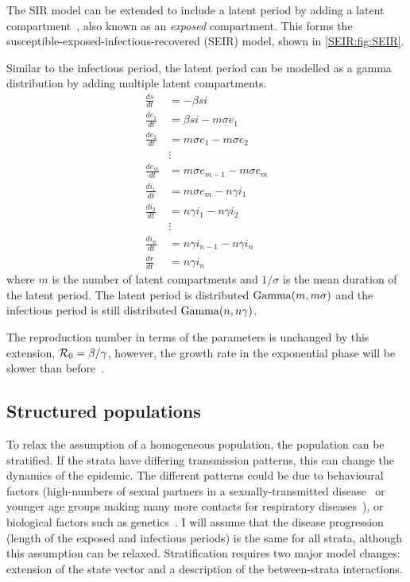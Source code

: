 \documentclass[thesis.tex]{subfiles}
\begin{document}
The SIR model can be extended to include a latent period by adding a latent compartment~\autocite[41]{keelingModeling}, also known as an \emph{exposed} compartment.
This forms the susceptible-exposed-infectious-recovered (SEIR) model, shown in \cref{SEIR:fig:SEIR}.

Similar to the infectious period, the latent period can be modelled as a gamma distribution by adding multiple latent compartments.
\begin{align}
\frac{ds}{dt} &= -\beta si \\
\frac{de_1}{dt} &= \beta si - m\sigma e_1 \\
\frac{de_2}{dt} &= m\sigma e_1 - m \sigma e_2 \\
&\vdots \nonumber \\
\frac{de_m}{dt} &= m\sigma e_{m-1} - m \sigma e_m \\
\frac{di_1}{dt} &= m\sigma e_m - n\gamma i_1 \\
\frac{di_2}{dt} &= n\gamma i_1 - n \gamma i_2 \\
&\vdots \nonumber \\
\frac{di_n}{dt} &= n\gamma i_{n-1} - n \gamma i_n \\
\frac{dr}{dt} &= n\gamma i_n
\end{align}
where $m$ is the number of latent compartments and $1/\sigma$ is the mean duration of the latent period.
The latent period is distributed $\operatorname{Gamma}(m, m\sigma)$ and the infectious period is still distributed $\operatorname{Gamma}(n, n\gamma)$.

The reproduction number in terms of the parameters is unchanged by this extension, \ie $\mathcal{R}_{0} = \beta / \gamma$, however, the growth rate in the exponential phase will be slower than before~\autocite[41]{keelingModeling}.

\subsection{Structured populations} \label{SEIR:sec:structured-populations}

To relax the assumption of a homogeneous population, the population can be stratified.
If the strata have differing transmission patterns, this can change the dynamics of the epidemic.
The different patterns could be due to behavioural factors (\eg high-numbers of sexual partners in a sexually-transmitted disease~\autocite[69]{keelingModeling} or younger age groups making many more contacts for respiratory diseases~\autocite[176]{andersonInfectious}), or biological factors such as genetics~\autocite[208]{andersonInfectious}.
I will assume that the disease progression (\ie length of the exposed and infectious periods) is the same for all strata, although this assumption can be relaxed.
Stratification requires two major  model changes: extension of the state vector and a description of the between-strata interactions.
\end{document}
